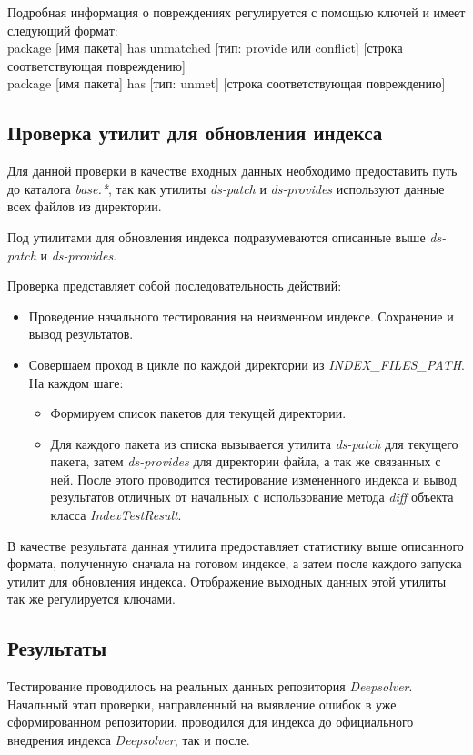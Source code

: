 Подробная информация о повреждениях регулируется с помощью ключей и имеет следующий формат:\\
package [имя пакета] has unmatched [тип: provide или conflict] [строка соответствующая повреждению]\\
package [имя пакета] has [тип: unmet] [строка соответствующая повреждению]\\

\subsection{Проверка утилит для обновления индекса}
\label{sn:patch_util_test}
Для данной проверки в качестве входных данных необходимо предоставить
путь до каталога \textit{base.*}, так как утилиты \textit{ds-patch} и 
\textit{ds-provides} используют данные всех файлов из директории.

Под утилитами для обновления индекса подразумеваются описанные
выше \textit{ds-patch} и \textit{ds-provides}.

Проверка представляет собой последовательность действий:

\begin{itemize}
\item{Проведение начального тестирования на неизменном индексе. Сохранение
и вывод результатов.}
\item{Совершаем проход в цикле по каждой директории из \emph{INDEX\_FILES\_PATH}. На
каждом шаге:
	\begin{itemize}
	\item{Формируем список пакетов для текущей директории.}
	\item{Для каждого пакета из списка вызывается утилита \textit{ds-patch }
	для текущего пакета, затем \textit{ds-provides} для директории файла, а 
	так же связанных с ней. После этого проводится тестирование
	измененного индекса и вывод результатов отличных от начальных
	с использование метода \textit{diff} объекта класса \textit{IndexTestResult}.}
	\end{itemize}
}
\end{itemize}

В качестве результата данная утилита предоставляет статистику выше описанного формата,
полученную сначала на готовом индексе, а затем после каждого запуска утилит для обновления
индекса. Отображение выходных данных этой утилиты так же регулируется ключами.

\subsection{Результаты}
Тестирование проводилось на реальных данных репозитория \textit{Deepsolver}.
Начальный этап проверки, направленный на выявление ошибок в уже сформированном репозитории,
проводился для индекса до официального внедрения индекса \textit{Deepsolver}, так и 
после.\\

